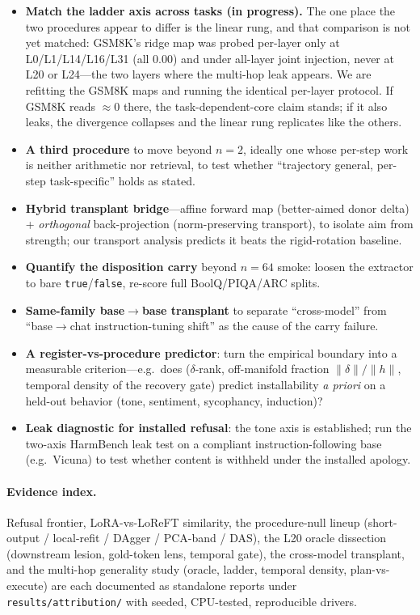\documentclass{article}
\begin{document}
\begin{itemize}
  \item \textbf{Match the ladder axis across tasks (in progress).} The one place the two procedures
  appear to differ is the linear rung, and that comparison is not yet matched: GSM8K's ridge map was
  probed per-layer only at L0/L1/L14/L16/L31 (all $0.00$) and under all-layer joint injection, never at
  L20 or L24---the two layers where the multi-hop leak appears. We are refitting the GSM8K maps and
  running the identical per-layer protocol. If GSM8K reads $\approx 0$ there, the task-dependent-core
  claim stands; if it also leaks, the divergence collapses and the linear rung replicates like the
  others.
  \item \textbf{A third procedure} to move beyond $n{=}2$, ideally one whose per-step work is neither
  arithmetic nor retrieval, to test whether ``trajectory general, per-step task-specific'' holds as
  stated.
  \item \textbf{Hybrid transplant bridge}---affine forward map (better-aimed donor delta) +
  \emph{orthogonal} back-projection (norm-preserving transport), to isolate aim from strength; our
  transport analysis predicts it beats the rigid-rotation baseline.
  \item \textbf{Quantify the disposition carry} beyond $n{=}64$ smoke: loosen the extractor to bare
  \texttt{true}/\texttt{false}, re-score full BoolQ/PIQA/ARC splits.
  \item \textbf{Same-family base$\to$base transplant} to separate ``cross-model'' from
  ``base$\to$chat instruction-tuning shift'' as the cause of the carry failure.
  \item \textbf{A register-vs-procedure predictor}: turn the empirical boundary into a measurable
  criterion---e.g.\ does ($\delta$-rank, off-manifold fraction $\lVert\delta\rVert/\lVert h\rVert$,
  temporal density of the recovery gate) predict installability \emph{a priori} on a held-out behavior
  (tone, sentiment, sycophancy, induction)?
  \item \textbf{Leak diagnostic for installed refusal}: the tone axis is established; run the two-axis
  HarmBench leak test on a compliant instruction-following base (e.g.\ Vicuna) to test whether content
  is withheld under the installed apology.
\end{itemize}

\paragraph{Evidence index.} Refusal frontier, LoRA-vs-LoReFT similarity, the procedure-null lineup
(short-output / local-refit / DAgger / PCA-band / DAS), the L20 oracle dissection (downstream lesion,
gold-token lens, temporal gate), the cross-model transplant, and the multi-hop generality study
(oracle, ladder, temporal density, plan-vs-execute) are each documented as standalone reports under
\texttt{results/attribution/} with seeded, CPU-tested, reproducible drivers.
\end{document}
